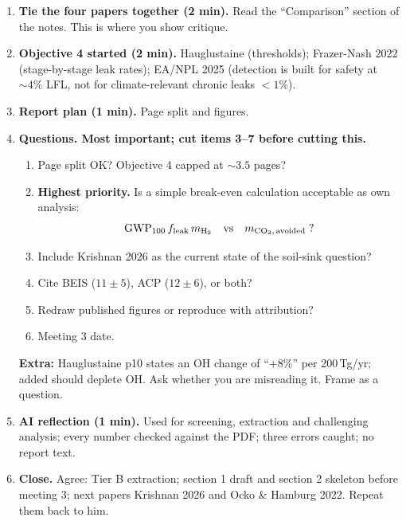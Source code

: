 \documentclass[10pt,a4paper]{article}
\begin{document}
\begin{enumerate}[label=\textbf{\arabic*.}]
  \item \textbf{Tie the four papers together (2 min).} Read the ``Comparison'' section of the notes. This is where you show critique.

  \item \textbf{Objective 4 started (2 min).} Hauglustaine (thresholds); Frazer-Nash 2022 (stage-by-stage leak rates); EA/NPL 2025 (detection is built for safety at $\sim 4\%$ LFL, not for climate-relevant chronic leaks $<1\%$).

  \item \textbf{Report plan (1 min).} Page split and figures.

  \item \textbf{Questions. Most important; cut items 3--7 before cutting this.}
  \begin{enumerate}[label=Q\arabic*.]
    \item Page split OK? Objective 4 capped at $\sim 3.5$ pages?
    \item \textbf{Highest priority.} Is a simple break-even calculation acceptable as own analysis:
    \[
      \mathrm{GWP}_{100}\, f_{\mathrm{leak}}\, m_{\ce{H2}} \quad \text{vs} \quad m_{\ce{CO2},\,\mathrm{avoided}} \;?
    \]
    \item Include Krishnan 2026 as the current state of the soil-sink question?
    \item Cite BEIS ($11 \pm 5$), ACP ($12 \pm 6$), or both?
    \item Redraw published figures or reproduce with attribution?
    \item Meeting 3 date.
  \end{enumerate}
  \textbf{Extra:} Hauglustaine p10 states an OH change of ``$+8\%$'' per 200\,Tg/yr; added  should deplete OH. Ask whether you are misreading it. Frame as a question.

  \item \textbf{AI reflection (1 min).} Used for screening, extraction and challenging analysis; every number checked against the PDF; three errors caught; no report text.

  \item \textbf{Close.} Agree: Tier B extraction; section 1 draft and section 2 skeleton before meeting 3; next papers Krishnan 2026 and Ocko \& Hamburg 2022. Repeat them back to him.
\end{enumerate}
\end{document}
